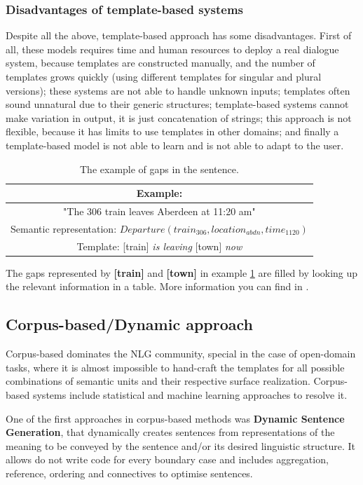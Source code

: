 \subsubsection{Disadvantages of template-based systems}
Despite all the above, template-based approach has some disadvantages. First of all, these models requires time and human resources to deploy a real dialogue system, because templates are constructed manually, and the number of templates grows quickly (using different templates for singular and plural versions); these systems are not able to handle unknown inputs; templates often sound unnatural due to their generic structures; template-based systems cannot make variation in output, it is just concatenation of strings; this approach is not flexible, because it has limits to use templates in other domains; and finally a template-based model is not able to learn and is not able to adapt to the user.

\begin{table}[t]
\centering
 \begin{tabular}{|c|} 
 \hline
 Example: \\
 \hline
 "The 306 train leaves Aberdeen at 11:20 am" \\ 
 \hline
 Semantic representation: 
 $Departure(train_{306}, location_{abdn}, time_{1120})$ \\
 \hline
 Template: 
 [train] \textit{is leaving} [town] \textit{now} \\
 \hline
 \end{tabular}
 \caption{The example of gaps in the sentence.}
\label{tab:tb_example}
\end{table}

The gaps represented by \textbf{[train]} and \textbf{[town]} in example \ref{tab:tb_example} are filled by looking up the relevant
information in a table. More information you can find in \cite{applied_nlg}.

\subsection{Corpus-based/Dynamic approach}
Corpus-based dominates the NLG community, special in the case of open-domain tasks, where it is almost impossible to hand-craft the templates for all possible combinations of semantic units and their respective surface realization.
Corpus-based systems include statistical and machine learning approaches to resolve it. 

One of the first approaches in corpus-based methods was \textbf{Dynamic Sentence Generation}, that dynamically creates sentences from representations of the meaning to be conveyed by the sentence and/or its desired linguistic structure. It allows do not write code for every boundary case and includes aggregation, reference, ordering and connectives to optimise sentences.

